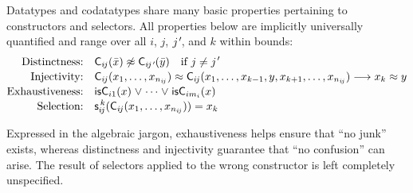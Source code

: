 Datatypes and codatatypes share many basic properties pertaining to
constructors and selectors. All properties below are implicitly universally
quantified and range over all $i$, $j$, $\jPrime$, and $k$ within bounds:
%
\[
\begin{aligned}[t]
\text{Distinctness:}\quad
  & %
    \smash{\const{C}_{i\negvthinspace j}(\bar x) \tneq \const{C}_{i\negvthinspace \jPrime}(\bar y) \quad\text{if $j \not= \jPrime$}}
  \\[-.5\jot]
\text{Injectivity:}\quad
  & %
    \smash{\const{C}_{i\negvthinspace j}(x_1,\ldots,x_{n_{i\negvthinspace j}}) \teq \const{C}_{i\negvthinspace j}(x_1,\ldots,x_{k-1},y,x_{k+1},\ldots,x_{n_{i\negvthinspace j}}) \longrightarrow x_k \teq y}
  \\[-.5\jot]
\text{Exhaustiveness:}\quad
  & \smash{\is{C}_{i1}(x) \mathrel\lor \cdots \mathrel\lor \is{C}_{im_i}(x)}
  \\[-.5\jot]
\text{Selection:}\quad
  & \smash{\const{s}_{i\negvthinspace j}^{\,k}(\const{C}_{i\negvthinspace j}(x_1,\ldots,x_{n_{i\negvthinspace j}})) = x_k}
\end{aligned}
\]
%
\begin{report}
Expressed in the algebraic jargon, exhaustiveness helps ensure that ``no
junk'' exists, whereas distinctness and injectivity guarantee that ``no
confusion'' can arise.
The result of selectors applied to the wrong
constructor is left completely unspecified.
\end{report}


